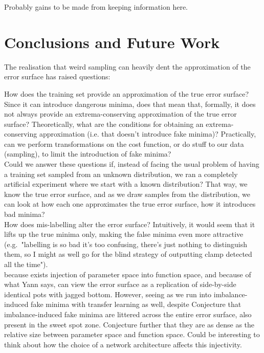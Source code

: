 \documentclass[a4paper,11pt]{article}
\begin{document}
Probably gains to be made from keeping information here. 

\clearpage
\section{Conclusions and Future Work}

The realisation that weird sampling can heavily dent the approximation of the error surface has raised questions:

How does the training set provide an approximation of the true error surface? Since it can introduce dangerous minima, does that mean that, formally, it does not always provide an extrema-conserving approximation of the true error surface? Theoretically, what are the conditions for obtaining an extrema-conserving approximation (i.e. that doesn't introduce fake minima)? Practically, can we perform transformations on the cost function, or do stuff to our data (sampling), to limit the introduction of fake minima?  \\

Could we answer these questions if, instead of facing the usual problem of having a training set sampled from an unknown distribution, we ran a completely artificial experiment where we start with a known distribution? That way, we know the true error surface, and as we draw samples from the distribution, we can look at how each one approximates the true error surface, how it introduces bad minima? \\

How does mis-labelling alter the error surface? Intuitively, it would seem that it lifts up the true minima only, making the false minima even more attractive (e.g.\ "labelling is so bad it's too confusing, there's just nothing to distinguish them, so I might as well go for the blind strategy of outputting clamp detected all the time"). \\

because exists injection of parameter space into function space, and because of what Yann says, can view the error surface as a replication of side-by-side identical pots with jagged bottom. However, seeing as we run into imbalance-induced fake minima with transfer learning as well, despite
Conjecture that imbalance-induced fake minima are littered across the entire error surface, also present in the sweet spot zone. Conjecture further that they are as dense as the relative size between parameter space and function space. Could be interesting to think about how the choice of a network architecture affects this injectivity.
\end{document}
